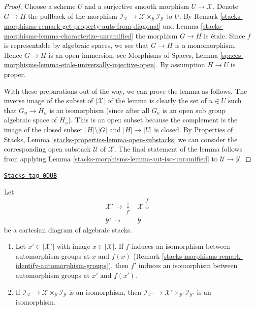 \begin{proof}
Choose a scheme $U$ and a surjective smooth morphism $U \to \mathcal{X}$.
Denote $G \to H$ the pullback of the morphism
$\mathcal{I}_\mathcal{X} \to
\mathcal{X} \times_\mathcal{Y} \mathcal{I}_\mathcal{Y}$
to $U$. By Remark \ref{stacks-morphisms-remark-get-property-auts-from-diagonal} and
Lemma \ref{stacks-morphisms-lemma-characterize-unramified} the morphism
$G \to H$ is \'etale. Since $f$ is representable by algebraic spaces,
we see that $G \to H$ is a monomorphism. Hence $G \to H$ is an open
immersion, see
Morphisms of Spaces, Lemma
\ref{spaces-morphisms-lemma-etale-universally-injective-open}.
By assumption $H \to U$ is proper.

\medskip\noindent
With these preparations out of the way, we can prove the lemma as follows.
The inverse image of the subset of $|\mathcal{X}|$ of the lemma is
clearly the set of $u \in U$ such that $G_u \to H_u$ is an isomorphism
(since after all $G_u$ is an open sub group algebraic space of $H_u$).
This is an open subset because the complement is
the image of the closed subset $|H| \setminus |G|$ and $|H| \to |U|$
is closed. By
Properties of Stacks, Lemma \ref{stacks-properties-lemma-open-substacks}
we can consider the corresponding open substack $\mathcal{U}$ of $\mathcal{X}$.
The final statement of the lemma follows from
applying Lemma \ref{stacks-morphisms-lemma-aut-iso-unramified}
to $\mathcal{U} \to \mathcal{Y}$.
\end{proof}

\begin{lemma}
\label{stacks-morphisms-lemma-base-change-stabilizer-preserving}
\href{https://stacks.math.columbia.edu/tag/0DUB}{\texttt{Stacks tag 0DUB}}

Let
$$
\begin{array}{cc}\mathcal{X}' \longrightarrow\underset{f'}{\downarrow} & \mathcal{X} \overset{f}{\downarrow} \\ \mathcal{Y}' \longrightarrow & \mathcal{Y}\end{array}
$$
be a cartesian diagram of algebraic stacks.
\begin{enumerate}
\item Let $x' \in |\mathcal{X}'|$ with image $x \in |\mathcal{X}|$.
If $f$ induces an isomorphism between automorphism groups at
$x$ and $f(x)$ (Remark \ref{stacks-morphisms-remark-identify-automorphism-groups}), then
$f'$ induces an isomorphism between automorphism groups at $x'$ and $f(x')$.
\item If $\mathcal{I}_\mathcal{X} \to
\mathcal{X} \times_\mathcal{Y} \mathcal{I}_\mathcal{Y}$ is an isomorphism,
then $\mathcal{I}_{\mathcal{X}'} \to
\mathcal{X}' \times_{\mathcal{Y}'} \mathcal{I}_{\mathcal{Y}'}$
is an isomorphism.
\end{enumerate}
\end{lemma}

